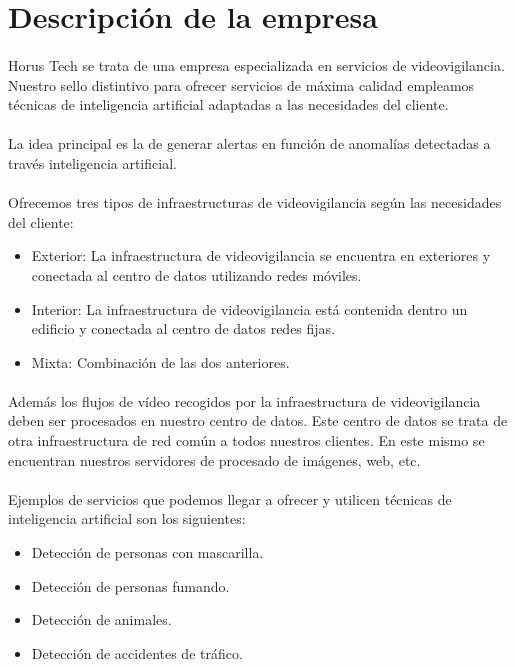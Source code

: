 \section{Descripción de la empresa}
\paragraph{}
Horus Tech se trata de una empresa especializada en servicios de videovigilancia. Nuestro sello distintivo para ofrecer servicios de máxima calidad empleamos técnicas de inteligencia artificial adaptadas a las necesidades del cliente.
\paragraph{}
La idea principal es la de generar alertas en función de anomalías detectadas a través inteligencia artificial.
\paragraph{}
Ofrecemos tres tipos de infraestructuras de videovigilancia según las necesidades del cliente:
\begin{itemize}
	\item Exterior: La infraestructura de videovigilancia se encuentra en exteriores y conectada al centro de datos utilizando redes móviles.
	\item Interior: La infraestructura de videovigilancia está contenida dentro un edificio y conectada al centro de datos redes fijas.
	\item Mixta: Combinación de las dos anteriores.
\end{itemize}
\paragraph{}
Además los flujos de vídeo recogidos por la infraestructura de videovigilancia deben ser procesados en nuestro centro de datos. Este centro de datos se trata de otra infraestructura de red común a todos nuestros clientes. En este mismo se encuentran nuestros servidores de procesado de imágenes, web, etc.
\paragraph{}
Ejemplos de servicios que podemos llegar a ofrecer y utilicen técnicas de inteligencia artificial son los siguientes:
\begin{itemize}
	\item Detección de personas con mascarilla.
	\item Detección de personas fumando.
	\item Detección de animales.
	\item Detección de accidentes de tráfico.
\end{itemize}